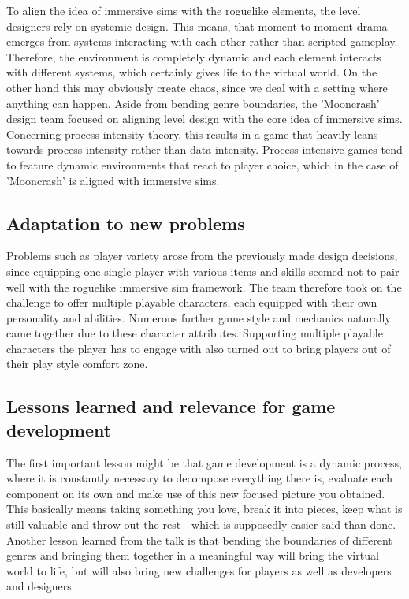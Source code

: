 \documentclass[a4paper]{article}
\begin{document}
\noindent To align the idea of immersive sims with the roguelike elements, the level designers rely on systemic design. This means, that moment-to-moment drama emerges from systems interacting with each other rather than scripted gameplay. Therefore, the environment is completely dynamic and each element interacts with different systems, which certainly gives life to the virtual world. On the other hand this may obviously create chaos, since we deal with a setting where anything can happen.
Aside from bending genre boundaries, the 'Mooncrash' design team focused on aligning level design with the core idea of immersive sims. Concerning process intensity theory, this results in a game that heavily leans towards process intensity rather than data intensity. Process intensive games tend to feature dynamic environments that react to player choice, which in the case of 'Mooncrash' is aligned with immersive sims. 

\subsection{Adaptation to new problems}
Problems such as player variety arose from the previously made design decisions, since equipping one single player with various items and skills seemed not to pair well with the roguelike immersive sim framework. The team therefore took on the challenge to offer multiple playable characters, each equipped with their own personality and abilities. Numerous further game style and mechanics naturally came together due to these character attributes. Supporting multiple playable characters the player has to engage with also turned out to bring players out of their play style comfort zone. 

\subsection{Lessons learned and relevance for game development}
The first important lesson might be that game development is a dynamic process, where it is constantly necessary to decompose everything there is, evaluate each component on its own and make use of this new focused picture you obtained. This basically means taking something you love, break it into pieces, keep what is still valuable and throw out the rest - which is supposedly easier said than done. Another lesson learned from the talk is that bending the boundaries of different genres and bringing them together in a meaningful way will bring the virtual world to life, but will also bring new challenges for players as well as developers and designers. 
\end{document}
